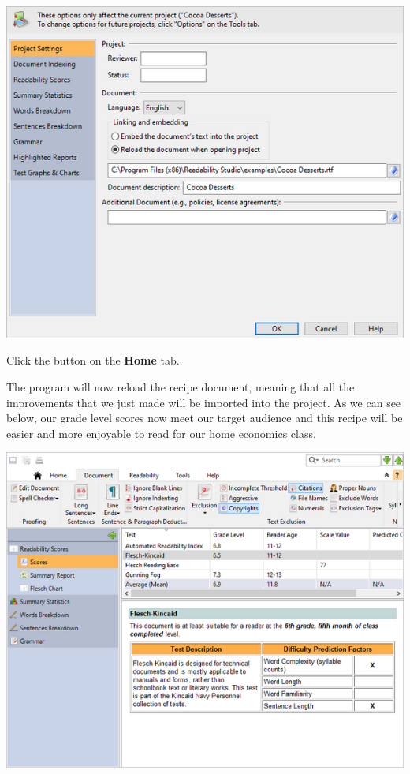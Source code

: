 \documentclass[
]{book}
\theoremstyle{definition}
\theoremstyle{definition}
\theoremstyle{definition}
\theoremstyle{definition}
\theoremstyle{remark}
\begin{document}
\includegraphics{Images/linktofile.png}

Click the  button on the \textbf{Home} tab.

The program will now reload the recipe document, meaning that all the improvements that we just made will be imported into the project. As we can see below, our grade level scores now meet our target audience and this recipe will be easier and more enjoyable to read for our home economics class.

\includegraphics{Images/improvedscores.png}
\end{document}
